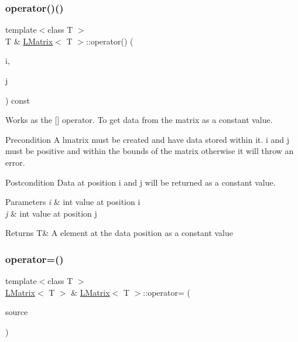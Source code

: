 \subsubsection{\texorpdfstring{operator()()}{operator()()}\hspace{0.1cm}{\footnotesize\ttfamily [2/2]}}
{\footnotesize\ttfamily template$<$class T $>$ \\
T \& \mbox{\hyperlink{class_l_matrix}{L\+Matrix}}$<$ T $>$\+::operator() (\begin{DoxyParamCaption}\item[{const int \&}]{i,  }\item[{const int \&}]{j }\end{DoxyParamCaption}) const}



Works as the \mbox{[}\mbox{]} operator. To get data from the matrix as a constant value. 

\begin{DoxyPrecond}{Precondition}
A lmatrix must be created and have data stored within it. i and j must be positive and within the bounds of the matrix otherwise it will throw an error. 
\end{DoxyPrecond}
\begin{DoxyPostcond}{Postcondition}
Data at position i and j will be returned as a constant value.
\end{DoxyPostcond}

\begin{DoxyParams}{Parameters}
{\em i} & int value at position i \\
\hline
{\em j} & int value at position j \\
\hline
\end{DoxyParams}
\begin{DoxyReturn}{Returns}
T\& A element at the data position as a constant value 
\end{DoxyReturn}
\mbox{\label{class_l_matrix_ad4feb8e3706e9ce8fdb07e63d985f52f}} 
\subsubsection{\texorpdfstring{operator=()}{operator=()}\hspace{0.1cm}{\footnotesize\ttfamily [1/2]}}
{\footnotesize\ttfamily template$<$class T $>$ \\
\mbox{\hyperlink{class_l_matrix}{L\+Matrix}}$<$ T $>$ \& \mbox{\hyperlink{class_l_matrix}{L\+Matrix}}$<$ T $>$\+::operator= (\begin{DoxyParamCaption}\item[{const \mbox{\hyperlink{class_l_matrix}{L\+Matrix}}$<$ T $>$ \&}]{source }\end{DoxyParamCaption})\hspace{0.3cm}{\ttfamily [virtual]}}



